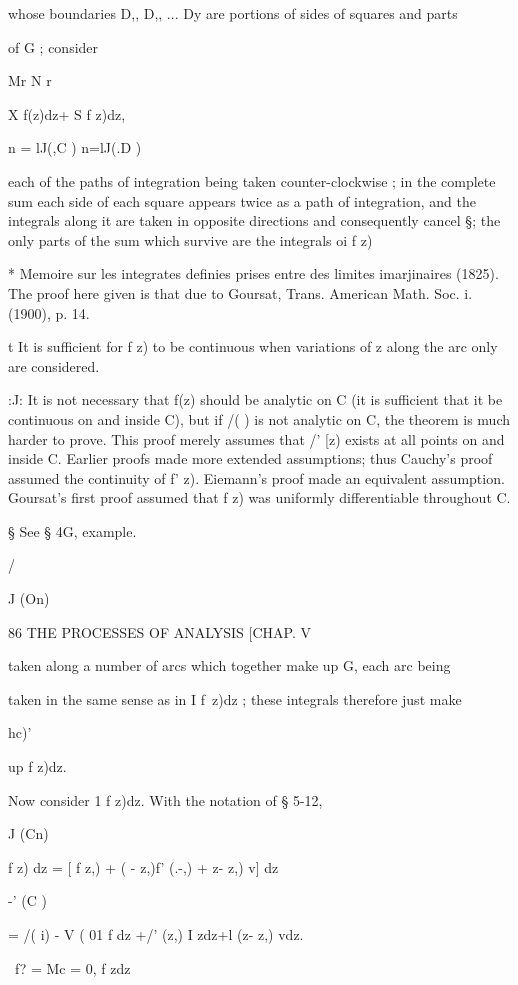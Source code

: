 whose boundaries D,, D,, ... Dy are portions of sides of squares and
parts

of G ; consider

Mr N r

X f(z)dz+ S f z)dz,

n = lJ(,C ) n=lJ(.D )

each of the paths of integration being taken counter-clockwise ; in
the complete sum each side of each square appears twice as a path of
integration, and the integrals along it are taken in opposite
directions and consequently cancel §; the only parts of the sum which
survive are the integrals oi f z)

* Memoire sur les integrates definies prises entre des limites
imarjinaires (1825). The proof here given is that due to Goursat,
Trans. American Math. Soc. i. (1900), p. 14.

t It is sufficient for f z) to be continuous when variations of z
along the arc only are considered.

:J: It is not necessary that f(z) should be analytic on C (it is
sufficient that it be continuous on and inside C), but if /( ) is not
analytic on C, the theorem is much harder to prove. This proof merely
assumes that /' [z) exists at all points on and inside C. Earlier
proofs made more extended assumptions; thus Cauchy's proof assumed the
continuity of f' z). Eiemann's proof made an equivalent assumption.
Goursat's first proof assumed that f z) was uniformly differentiable
throughout C.

§ See § 4G, example.



/

J (On)



86 THE PROCESSES OF ANALYSIS [CHAP. V

taken along a number of arcs which together make up G, each arc being

taken in the same sense as in I f\ z)dz ; these integrals therefore
just make

hc)'

up f z)dz.

Now consider 1 f z)dz. With the notation of § 5-12,

J (Cn)

f z) dz = [ f z,) + ( - z,)f' (.-,) + z- z,) v] dz

-' (C )

= /( i) - V ( 01 f dz +/' (z,) I zdz+l (z- z,) vdz.

\ f? = Mc = 0, f zdz

